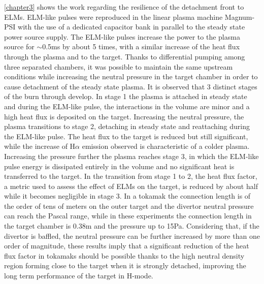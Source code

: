 \autoref{chapter3} shows the work regarding the resilience of the detachment front to ELMs. ELM-like pulses were reproduced in the linear plasma machine Magnum-PSI with the use of a dedicated capacitor bank in parallel to the steady state power source supply. The ELM-like pulses increase the power to the plasma source for $\sim$0.5ms by about 5 times, with a similar increase of the heat flux through the plasma and to the target. Thanks to differential pumping among three separated chambers, it was possible to maintain the same upstream conditions while increasing the neutral pressure in the target chamber in order to cause detachment of the steady state plasma. It is observed that 3 distinct stages of the burn through develop. In stage 1 the plasma is attached in steady state and during the ELM-like pulse, the interactions in the volume are minor and a high heat flux is deposited on the target. Increasing the neutral pressure, the plasma transitions to stage 2, detaching in steady state and reattaching during the ELM-like pulse. The heat flux to the target is reduced but still significant, while the increase of H$\alpha$ emission observed is characteristic of a colder plasma. Increasing the pressure further the plasma reaches stage 3, in which the ELM-like pulse energy is dissipated entirely in the volume and no significant heat is transferred to the target. In the transition from stage 1 to 2, the heat flux factor, a metric used to assess the effect of ELMs on the target, is reduced by about half while it becomes negligible in stage 3. In a tokamak the connection length is of the order of tens of meters on the outer target and the divertor neutral pressure can reach the Pascal range, while in these experiments the connection length in the target chamber is 0.38m and the pressure up to 15Pa. Considering that, if the divertor is baffled, the neutral pressure can be further increased by more than one order of magnitude, these results imply that a significant reduction of the heat flux factor in tokamaks should be possible thanks to the high neutral density region forming close to the target when it is strongly detached, improving the long term performance of the target in H-mode. 

